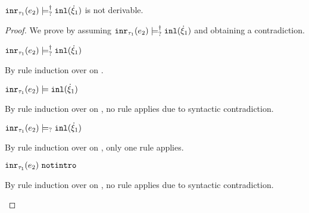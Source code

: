 \begin{lemma}
  \label{lem:inr-notsatormay-inl}
  $\mathtt{inr}_{\tau_1}({e_2}) \models_{?}^{\dag} \mathtt{inl}(\dot{\xi}_1)$ is not derivable.
\end{lemma}
\begin{proof}
  We prove by assuming $\mathtt{inr}_{\tau_1}({e_2}) \models_{?}^{\dag} \mathtt{inl}(\dot{\xi}_1)$ and obtaining a contradiction.
  \begin{pfsteps*}
  \item $\mathtt{inr}_{\tau_1}({e_2}) \models_{?}^{\dag} \mathtt{inl}(\dot{\xi}_1)$  
  \end{pfsteps*}
  By rule induction over  on .
  \begin{byCases}
    \item[\text{(\ref{rule:CSMSSat})}]
    \begin{pfsteps*}
    \item $\mathtt{inr}_{\tau_1}({e_2}) \models \mathtt{inl}(\dot{\xi}_1)$  
    \end{pfsteps*} 
    By rule induction over  on , no rule applies due to syntactic contradiction.
    \item[\text{(\ref{rule:CSMSMay})}] 
    \begin{pfsteps*}
    \item $\mathtt{inr}_{\tau_1}({e_2}) \models_{?} \mathtt{inl}(\dot{\xi}_1)$  
    \end{pfsteps*} 
    By rule induction over  on , only one rule applies.
    \begin{byCases}
      \item[\text{(\ref{rule:CMSNotIntro})}]
      \begin{pfsteps*}
      \item $\mathtt{inr}_{\tau_1}({e_2}) ~\mathtt{notintro}$  
      \end{pfsteps*} 
      By rule induction over  on , no rule applies due to syntactic contradiction.
    \end{byCases}
  \end{byCases}
  \resetpfcounter
\end{proof}

